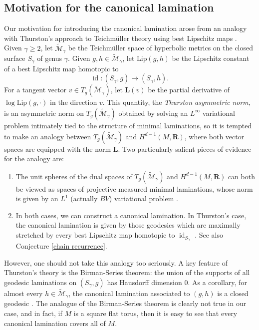 \documentclass[reqno,11pt]{amsart}
\newcommand{\RR}{\mathbf{R}}
\DeclareMathOperator{\id}{id}
\newcommand{\Lip}{\mathrm{Lip}}
\newcommand{\Comass}{\mathbf L}
\newcommand{\dfn}[1]{\emph{#1}\index{#1}}
\theoremstyle{definition}
\numberwithin{equation}{section}
\begin{document}
\subsection{Motivation for the canonical lamination}\label{Teichmuller}
Our motivation for introducing the canonical lamination arose from an analogy with Thurston's approach to Teichm\"uller theory using best Lipschitz maps \cite{Thurston98}.
Given $\gamma \geq 2$, let $\widetilde{\mathscr M}_\gamma$ be the Teichm\"uller space of hyperbolic metrics on the closed surface $S_\gamma$ of genus $\gamma$.
Given $g, h \in \widetilde{\mathscr M}_\gamma$, let $\Lip(g, h)$ be the Lipschitz constant of a best Lipschitz map homotopic to
$$\id: (S_\gamma, g) \to (S_\gamma, h).$$ 
For a tangent vector $v \in T_g(\widetilde{\mathscr M}_\gamma)$, let $\Comass(v)$ be the partial derivative of $\log \Lip(g, \cdot)$ in the direction $v$.
This quantity, the \dfn{Thurston asymmetric norm}, is an asymmetric norm on $T_g(\widetilde{\mathscr M}_\gamma)$ obtained by solving an $L^\infty$ variational problem intimately tied to the structure of minimal laminations, so it is tempted to make an analogy between $T_g(\widetilde{\mathscr M}_\gamma)$ and $H^{d - 1}(M, \RR)$, where both vector spaces are equipped with the norm $\Comass$.
Two particularly salient pieces of evidence for the analogy are:
\begin{enumerate}
\item The unit spheres of the dual spaces of $T_g(\widetilde{\mathscr M}_\gamma)$ and $H^{d - 1}(M, \RR)$ can both be viewed as spaces of projective measured minimal laminations, whose norm is given by an $L^1$ (actually $BV$) variational problem \cite[Theorem 5.1]{Thurston98}.
\item In both cases, we can construct a canonical lamination. In Thurston's case, the canonical lamination is given by those geodesics which are maximally stretched by every best Lipschitz map homotopic to $\id_{S_\gamma}$ \cite[\S8]{Thurston98}. See also Conjecture \ref{chain recurrence}.
\end{enumerate}
However, one should not take this analogy too seriously.
A key feature of Thurston's theory is the Birman-Series theorem: the union of the supports of all geodesic laminations on $(S_\gamma, g)$ has Hausdorff dimension $0$.
As a corollary, for almost every $h \in \widetilde{\mathscr M}_\gamma$, the canonical lamination associated to $(g, h)$ is a closed geodesic \cite[\S10]{Thurston98}.
The analogue of the Birman-Series theorem is clearly not true in our case, and in fact, if $M$ is a square flat torus, then it is easy to see that every canonical lamination covers all of $M$.
\end{document}
